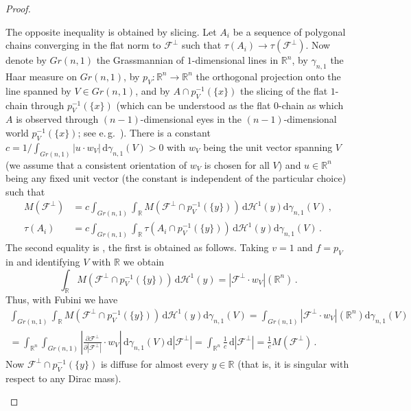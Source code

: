 \documentclass[10pt,a4paper,oneside,final]{article}
\newcommand{\R}{{\mathbb{R}}}
\newcommand{\de}{{\mathrm{d}}}
\newcommand{\hdone}{\mathcal{H}^1}
\newcommand{\restr}{{\mbox{\LARGE$\llcorner$}}}
\newcommand{\mass}[1]{M(#1)}
\newcommand{\cont}{{\mathrm{C}}}
\newcommand{\flux}{{\mathcal{F}}}
\numberwithin{equation}{section}
\theoremstyle{plain}
\theoremstyle{definition}
\theoremstyle{remark}
\begin{document}
\begin{proof}
\begin{itemize}
The opposite inequality is obtained by slicing.
Let $A_i$ be a sequence of polygonal chains converging in the flat norm to $\flux^\perp$ such that $\tau(A_i)\to\tau(\flux^\perp)$.
Now denote by $Gr(n,1)$ the Grassmannian of $1$-dimensional lines in $\R^n$, by $\gamma_{n,1}$ the Haar measure on $Gr(n,1)$,
by $p_V:\R^n\to\R^n$ the orthogonal projection onto the line spanned by $V\in Gr(n,1)$,
and by $A\cap p_V^{-1}(\{x\})$ the slicing of the flat $1$-chain through $p_V^{-1}(\{x\})$
(which can be understood as the flat $0$-chain as which $A$ is observed through $(n-1)$-dimensional eyes in the $(n-1)$-dimensional world $p_V^{-1}(\{x\})$; see e.\,g.\ \cite[Sec.\,4.3]{Fe69}).
There is a constant $c=1/\int_{Gr(n,1)}|u\cdot w_V|\,\de\gamma_{n,1}(V)>0$
with $w_V$ being the unit vector spanning $V$ (we assume that a consistent orientation of $w_V$ is chosen for all $V$) and $u\in\R^n$ being any fixed unit vector (the constant is independent of the particular choice) such that
\begin{align*}
\mass{\flux^\perp}
&=c\int_{Gr(n,1)}\int_\R\mass{\flux^\perp\cap p_V^{-1}(\{y\})}\,\de\hdone(y)\de\gamma_{n,1}(V)\,,\\
\tau(A_i)
&=c\int_{Gr(n,1)}\int_\R\tau(A_i\cap p_V^{-1}(\{y\}))\,\de\hdone(y)\de\gamma_{n,1}(V)\,.
\end{align*}
The second equality is \cite[(3.2)]{CoRoMa17}, the first is obtained as follows.
Taking $v=1$ and $f=p_V$ in \cite[4.3.2(2) and following statement]{Fe69} and identifying $V$ with $\R$ we obtain
\begin{equation*}
\int_\R\mass{\flux^\perp\cap p_V^{-1}(\{y\})}\,\de\hdone(y)=|\flux^\perp\cdot w_V|(\R^n)\,.
\end{equation*}
Thus, with Fubini we have
\begin{multline*}
\int_{Gr(n,1)}\int_\R\mass{\flux^\perp\cap p_V^{-1}(\{y\})}\,\de\hdone(y)\de\gamma_{n,1}(V)
=\int_{Gr(n,1)}|\flux^\perp\cdot w_V|(\R^n)\de\gamma_{n,1}(V)\\
=\int_{\R^n}\int_{Gr(n,1)}|\tfrac{\partial\flux^\perp}{\partial|\flux^\perp|}\cdot w_V|\,\de\gamma_{n,1}(V)\de|\flux^\perp|
=\int_{\R^n}\tfrac1c\,\de|\flux^\perp|
=\tfrac1c\mass{\flux^\perp}\,.
\end{multline*}
Now $\flux^\perp\cap p_V^{-1}(\{y\})$ is diffuse for almost every $y\in\R$ (that is, it is singular with respect to any Dirac mass).

\end{itemize}
\end{proof}
\end{document}
